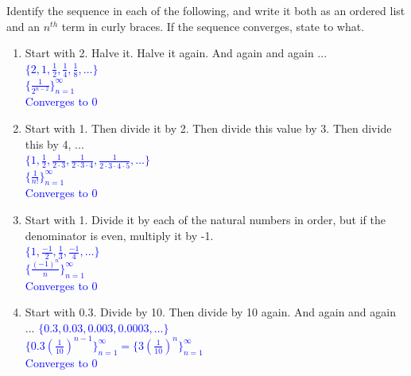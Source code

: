 \documentclass{ximera}
\begin{document}
\begin{exercise}
    Identify the sequence in each of the following, and write it both as an ordered list and an $n^{th}$ term in curly braces. If the sequence converges, state to what.
\begin{enumerate}
      \item Start with 2.  Halve it.  Halve it again. And again and again ... \\
    \textcolor{blue}{ $\{2, 1, \frac{1}{2}, \frac14, \frac18,\dots\}$\\
    $\{\frac{1}{2^{n-2}}\}_{n=1}^{\infty}$\\
    Converges to 0}
    \item Start with 1.  Then divide it by 2.  Then divide this value by 3.  Then divide this by 4, ... \\
    \textcolor{blue}{ $\{1, \frac{1}{2}, \frac{1}{2\cdot 3}, \frac{1}{2\cdot 3 \cdot 4}, \frac{1}{2\cdot3\cdot4\cdot5}, \dots \}$\\
    $\{\frac{1}{n!}\}_{n=1}^{\infty}$\\
    Converges to 0}
    \item Start with 1.  Divide it by each of the natural numbers in order, but if the denominator is even, multiply it by -1.\\
    \textcolor{blue}{ $\{1, \frac{-1}{2}, \frac13, \frac{-1}{4}, \dots \}$\\
    $\{\frac{(-1)^n}{n}\}_{n=1}^\infty$\\
    Converges to 0}
    \item Start with 0.3.  Divide by 10.  Then divide by 10 again.  And again and again ...
    \textcolor{blue}{ $\{0.3, 0.03, 0.003, 0.0003, \dots \}$\\
    $\{0.3(\frac{1}{10})^{n-1}\}_{n=1}^\infty=\{3(\frac{1}{10})^n\}_{n=1}^\infty$\\
    Converges to 0}
\end{enumerate}
\end{exercise}
\end{document}
